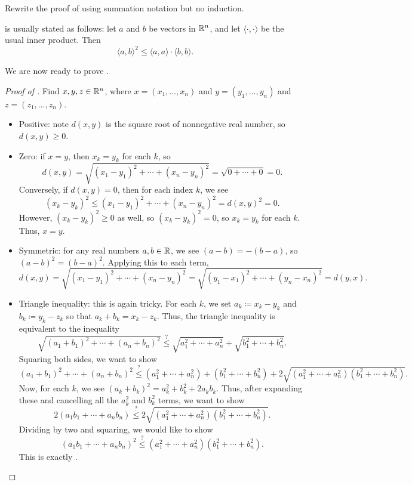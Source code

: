 \documentclass[../main.tex]{subfiles}
\begin{document}
\begin{exe}
    Rewrite the proof of  using summation notation but no induction.
\end{exe}
\begin{remark}
     is usually stated as follows: let $a$ and $b$ be vectors in $\mathbb R^n$, and let $\langle\cdot,\cdot\rangle$ be the usual inner product. Then
    \[\langle a,b\rangle^2\le\langle a,a\rangle\cdot\langle b,b\rangle.\]
\end{remark}
We are now ready to prove .
\begin{proof}[Proof of ]
    Find $x,y,z\in\mathbb R^n$, where $x=(x_1,\ldots,x_n)$ and $y=(y_1,\ldots,y_n)$ and $z=(z_1,\ldots,z_n)$.
    \begin{itemize}
        \item Positive: note $d(x,y)$ is the square root of nonnegative real number, so $d(x,y)\ge0$.
        \item Zero: if $x=y$, then $x_k=y_k$ for each $k$, so
        \[d(x,y)=\sqrt{(x_1-y_1)^2+\cdots+(x_n-y_n)^2}=\sqrt{0+\cdots+0}=0.\]
        Conversely, if $d(x,y)=0$, then for each index $k$, we see
        \[(x_k-y_k)^2\le(x_1-y_1)^2+\cdots+(x_n-y_n)^2=d(x,y)^2=0.\]
        However, $(x_k-y_k)^2\ge0$ as well, so $(x_k-y_k)^2=0$, so $x_k=y_k$ for each $k$. Thus, $x=y$.
        \item Symmetric: for any real numbers $a,b\in\mathbb R$, we see $(a-b)=-(b-a)$, so $(a-b)^2=(b-a)^2$. Applying this to each term,
        \[d(x,y)=\sqrt{(x_1-y_1)^2+\cdots+(x_n-y_n)^2}=\sqrt{(y_1-x_1)^2+\cdots+(y_n-x_n)^2}=d(y,x).\]
        \item Triangle inequality: this is again tricky. For each $k$, we set $a_k\coloneqq x_k-y_k$ and $b_k\coloneqq y_k-z_k$ so that $a_k+b_k=x_k-z_k$. Thus, the triangle inequality is equivalent to the inequality
        \[\sqrt{(a_1+b_1)^2+\cdots+(a_n+b_n)^2}\stackrel?\le\sqrt{a_1^2+\cdots+a_n^2}+\sqrt{b_1^2+\cdots+b_n^2}.\]
        Squaring both sides, we want to show
        \[(a_1+b_1)^2+\cdots+(a_n+b_n)^2\stackrel?\le\left(a_1^2+\cdots+a_n^2\right)+\left(b_1^2+\cdots+b_n^2\right)+2\sqrt{\left(a_1^2+\cdots+a_n^2\right)\left(b_1^2+\cdots+b_n^2\right)}.\]
        Now, for each $k$, we see $(a_k+b_k)^2=a_k^2+b_k^2+2a_kb_k$. Thus, after expanding these and cancelling all the $a_k^2$ and $b_k^2$ terms, we want to show
        \[2(a_1b_1+\cdots+a_nb_n)\stackrel?\le2\sqrt{\left(a_1^2+\cdots+a_n^2\right)\left(b_1^2+\cdots+b_n^2\right)}.\]
        Dividing by two and squaring, we would like to show
        \[(a_1b_1+\cdots+a_nb_n)^2\stackrel?\le\left(a_1^2+\cdots+a_n^2\right)\left(b_1^2+\cdots+b_n^2\right).\]
        This is exactly .
        \qedhere
    \end{itemize}
\end{proof}
\end{document}
